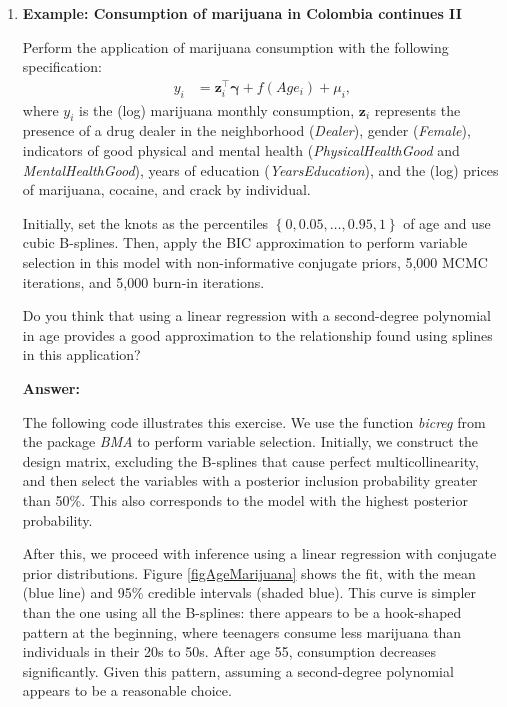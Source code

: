 \begin{enumerate}[leftmargin=*]
	\item \textbf{Example: Consumption of marijuana in Colombia continues II}

Perform the application of marijuana consumption with the following specification:
\begin{align*}
	y_i & = \boldsymbol{z}_i^{\top} \boldsymbol{\gamma} + f(Age_{i}) + \mu_i,
\end{align*}
where $y_i$ is the (log) marijuana monthly consumption, $\boldsymbol{z}_i$ represents the presence of a drug dealer in the neighborhood (\textit{Dealer}), gender (\textit{Female}), indicators of good physical and mental health (\textit{PhysicalHealthGood} and \textit{MentalHealthGood}), years of education (\textit{YearsEducation}), and the (log) prices of marijuana, cocaine, and crack by individual.

Initially, set the knots as the percentiles $\left\{0,0.05,\dots,0.95,1\right\}$ of age and use cubic B-splines. Then, apply the BIC approximation to perform variable selection in this model with non-informative conjugate priors, 5,000 MCMC iterations, and 5,000 burn-in iterations.

Do you think that using a linear regression with a second-degree polynomial in age provides a good approximation to the relationship found using splines in this application?

\textbf{Answer:}

The following code illustrates this exercise. We use the function \textit{bicreg} from the package \textit{BMA} to perform variable selection. Initially, we construct the design matrix, excluding the B-splines that cause perfect multicollinearity, and then select the variables with a posterior inclusion probability greater than 50\%. This also corresponds to the model with the highest posterior probability.

After this, we proceed with inference using a linear regression with conjugate prior distributions. Figure \ref{figAgeMarijuana} shows the fit, with the mean (blue line) and 95\% credible intervals (shaded blue). This curve is simpler than the one using all the B-splines: there appears to be a hook-shaped pattern at the beginning, where teenagers consume less marijuana than individuals in their 20s to 50s. After age 55, consumption decreases significantly. Given this pattern, assuming a second-degree polynomial appears to be a reasonable choice.


\end{enumerate}
